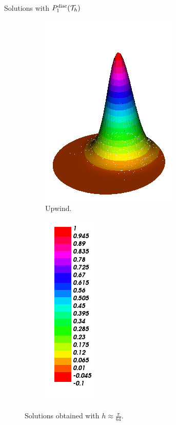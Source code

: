 \begin{frame}{Solutions with $\relax{P}^{\text{disc}}_1(\mathcal{T}_h)$}
\begin{figure}[h!]
\begin{subfigure}[b]{0.27\textwidth}
				\centering
				\includegraphics[scale=0.18]{img/Conveccion_Reaccion/Recortes/steady_convect_react_approx_UPW_n_128.png}
				\caption{Upwind.}
			\end{subfigure}
			\begin{subfigure}[b]{0.15\textwidth}
				\centering
				\includegraphics[scale=0.18]{img/Conveccion_Reaccion/Recortes/steady_convect_react_values.png}
			\end{subfigure}
			\caption{Solutions obtained with $h\approx\frac{\pi}{64}$.}
		\end{figure}
		\begin{figure}[h!]
			\vspace*{-0.5cm}
			\begin{subfigure}[b]{0.27\textwidth}
				\centering

\end{subfigure}
\end{figure}
\end{frame}
